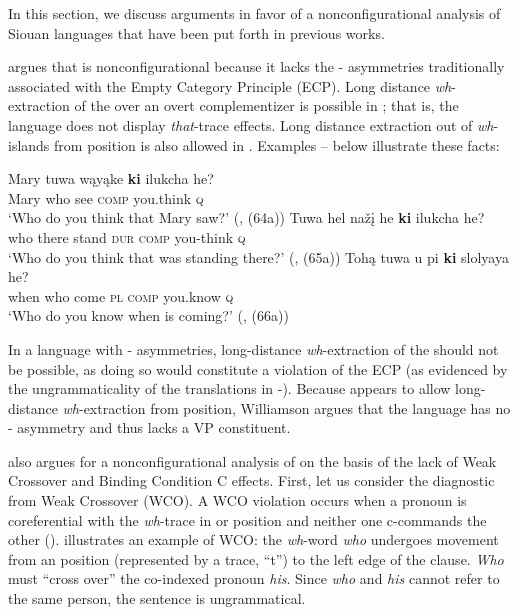 \documentclass[output=paper]{LSP/langsci}
\begin{document}
In this section, we discuss arguments in favor of a nonconfigurational analysis of Siouan languages that have been put forth in previous works.
	
\citet{Williamson1984} argues that  is nonconfigurational because it lacks the - asymmetries traditionally associated with the Empty Category Principle (ECP).  Long distance \textit{wh}-extraction of the  over an overt complementizer is possible in ; that is, the language does not display \textit{that}-trace effects. Long distance extraction out of \textit{wh}-islands from  position is also allowed in .  Examples -- below illustrate these facts:

\begin{exe}
\ex\label{ex:jrs:6} \gll Mary		tuwa		wąyąke	\textbf{ki}			ilukcha 		he? \\
Mary 	who		see 			\textsc{comp}		you.think	\textsc{q} \\
\trans `Who do you think that Mary saw?' (\citealt[281]{Williamson1984}, (64a))
\ex\label{ex:jrs:7} \gll Tuwa		hel			na\v{z}\k{i} 		he		\textbf{ki}			ilukcha 		he? \\
who		there		stand		\textsc{dur} 	\textsc{comp}		you-think	\textsc{q} \\
\trans `Who do you think that was standing there?' (\citealt[281]{Williamson1984}, (65a))
\ex\label{ex:jrs:8} \gll	Tohą		tuwa	u				pi	\textbf{ki} 			slolyaya		he? \\
when		who	come		\textsc{pl} 	\textsc{comp} 	you.know \textsc{q} \\
\trans `Who do you know when is coming?' (\citealt[281]{Williamson1984}, (66a))
\end{exe} 

In a language with - asymmetries, long-distance \textit{wh}-extraction of the  should not be possible, as doing so would constitute a violation of the ECP (as evidenced by the ungrammaticality of the  translations in -).  Because  appears to allow long-distance \textit{wh}-extraction from  position, Williamson argues that the language has no - asymmetry and thus lacks a VP constituent.

\citet{VanValin1985,VanValin1987} also argues for a nonconfigurational analysis of  on the basis of the lack of Weak Crossover and Binding Condition C effects.  First, let us consider the diagnostic from Weak Crossover (WCO). A WCO violation occurs when a pronoun is coreferential with the \textit{wh}-trace in  or  position and neither one c-commands the other (\citealt{Sportiche1985}).   illustrates an  example of WCO: the \textit{wh}-word \textit{who} undergoes movement from an  position (represented by a trace, ``t'') to the left edge of the clause. \textit{Who} must ``cross over'' the co-indexed pronoun \textit{his}. Since \textit{who} and \textit{his} cannot refer to the same person, the sentence is ungrammatical. 
\end{document}
